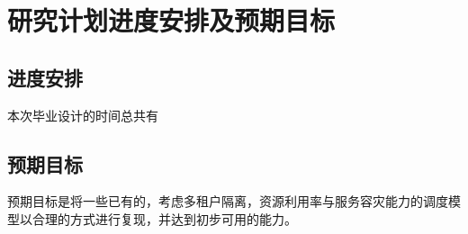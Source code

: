 \section{研究计划进度安排及预期目标}

\subsection{进度安排}

本次毕业设计的时间总共有

\subsection{预期目标}

预期目标是将一些已有的，考虑多租户隔离，资源利用率与服务容灾能力的调度模型以合理的方式进行复现，并达到初步可用的能力。
